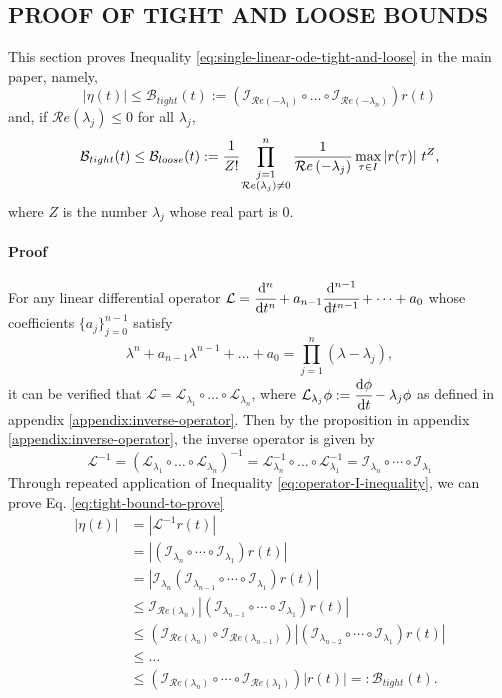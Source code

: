 \documentclass[]{uai2023}
\newcommand{\dt}[1]{\cfrac{\mathrm{d} #1}{\mathrm{d} t}}
\newcommand{\dnt}[2]{\cfrac{\mathrm{d}^{#1} #2}{\mathrm{d} t^{#1}}}
\newcommand{\Err}{\eta}
\newcommand{\Bound}{\mathcal{B}}
\renewcommand{\L}{\mathcal{L}}
\newcommand{\I}{\mathcal{I}}
\renewcommand{\Re}[1]{\mathcal{R}e\left(#1\right)}
\begin{document}
\subsection{PROOF OF TIGHT AND LOOSE BOUNDS}
This section proves Inequality \ref{eq:single-linear-ode-tight-and-loose} in the main paper, namely,
\begin{equation}\label{eq:tight-bound-to-prove}
    |\Err(t)| \leq \Bound_{tight}(t) :=\left(\I_{\Re{-\lambda_1}}\circ\dots\circ\I_{\Re{-\lambda_n}}\right)r(t)
\end{equation}
and, if $\Re{\lambda_j} \leq 0$ for all $\lambda_j$, 
\begin{equation}\label{eq:loose-bound-to-prove}
    \Bound_{tight}(t) \leq \Bound_{loose}(t) := \cfrac{1}{Z!} \prod_{\substack{j=1\\ \Re{\lambda_j} \neq 0}}^n \frac{1}{\Re{-\lambda_j}} \max_{\tau\in I}\left|r(\tau)\right|\, t^{Z},
\end{equation}
where $Z$ is the number $\lambda_j$ whose real part is $0$.

\paragraph{Proof} For any linear differential operator $\L=\dnt{n}{} + a_{n-1}\dnt{n-1}{}+\dots+a_0$ whose coefficients $\{a_j\}_{j=0}^{n-1}$ satisfy 
\[
    \lambda^n + a_{n-1}\lambda^{n-1} + \dots +a_0 = \prod_{j=1}^{n} \left(\lambda - \lambda_j\right),
\]
it can be verified that $\L = \L_{\lambda_1} \circ\dots \circ \L_{\lambda_n}$, where $\L_{\lambda_j}\phi := \dt{\phi}-\lambda_j\phi$ as defined in appendix \ref{appendix:inverse-operator}. Then by the proposition in appendix \ref{appendix:inverse-operator}, the inverse operator is given by
\begin{equation}
    \L^{-1} = \left(\L_{\lambda_1} \circ\dots \circ \L_{\lambda_n}\right)^{-1} = \L_{\lambda_n}^{-1} \circ\dots \circ \L_{\lambda_1}^{-1} = \I_{\lambda_n} \circ\cdots\circ\I_{\lambda_1}
\end{equation}
Through repeated application of Inequality \ref{eq:operator-I-inequality}, we can prove Eq. \ref{eq:tight-bound-to-prove}
\begin{align}
    \left|\Err(t)\right| &= \left| \L^{-1} r(t) \right| \\
    &=\left|\left(\I_{\lambda_n} \circ\cdots\circ\I_{\lambda_1}\right) r(t)\right| \\
    &=\left|\I_{\lambda_n}\left(\I_{\lambda_{n-1}} \circ\cdots\circ\I_{\lambda_1}\right) r(t)\right| \\
    &\leq \I_{\Re{\lambda_n}}\left|\left(\I_{\lambda_{n-1}} \circ\cdots\circ\I_{\lambda_1}\right) r(t)\right| \\
    &\leq \left(\I_{\Re{\lambda_n}}\circ \I_{\Re{\lambda_{n-1}}}\right)\left|\left(\I_{\lambda_{n-2}} \circ\cdots\circ\I_{\lambda_1}\right) r(t)\right| \\
    &\leq \dots \nonumber \\
    &\leq \left(\I_{\Re{\lambda_n}}\circ \cdots \circ\I_{\Re{\lambda_{1}}}\right)\left|r(t)\right| =: \Bound_{tight}(t).
\end{align}
\end{document}
